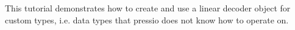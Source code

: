 

\begin{DoxyParagraph}{}
This tutorial demonstrates how to create and use a linear decoder object for custom types, i.\+e. data types that pressio does not know how to operate on.
\end{DoxyParagraph}

\begin{DoxyCode}{0}

\end{DoxyCode}
 